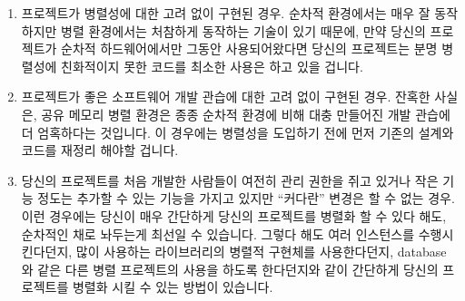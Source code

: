 {\begin{enumerate}

	\item	프로젝트가 병렬성에 대한 고려 없이 구현된 경우.
		순차적 환경에서는 매우 잘 동작하지만 병렬 환경에서는 처참하게
		동작하는 기술이 있기 때문에, 만약 당신의 프로젝트가 순차적
		하드웨어에서만 그동안 사용되어왔다면 당신의 프로젝트는 분명
		병렬성에 친화적이지 못한 코드를 최소한 사용은 하고 있을 겁니다.

	\item	프로젝트가 좋은 소프트웨어 개발 관습에 대한 고려 없이 구현된
		경우.
		잔혹한 사실은, 공유 메모리 병렬 환경은 종종 순차적 환경에 비해
		대충 만들어진 개발 관습에 더 엄혹하다는 것입니다.
		이 경우에는 병렬성을 도입하기 전에 먼저 기존의 설계와 코드를
		재정리 해야할 겁니다.

	\item	당신의 프로젝트를 처음 개발한 사람들이 여전히 관리 권한을 쥐고
		있거나 작은 기능 정도는 추가할 수 있는 기능을 가지고 있지만
		``커다란'' 변경은 할 수 없는 경우.
		이런 경우에는 당신이 매우 간단하게 당신의 프로젝트를 병렬화 할
		수 있다 해도, 순차적인 채로 놔두는게 최선일 수 있습니다.
		그렇다 해도 여러 인스턴스를 수행시킨다던지, 많이 사용하는
		라이브러리의 병렬적 구현체를 사용한다던지, database 와 같은
		다른 병렬 프로젝트의 사용을 하도록 한다던지와 같이 간단하게
		당신의 프로젝트를 병렬화 시킬 수 있는 방법이 있습니다.


\end{enumerate}}
